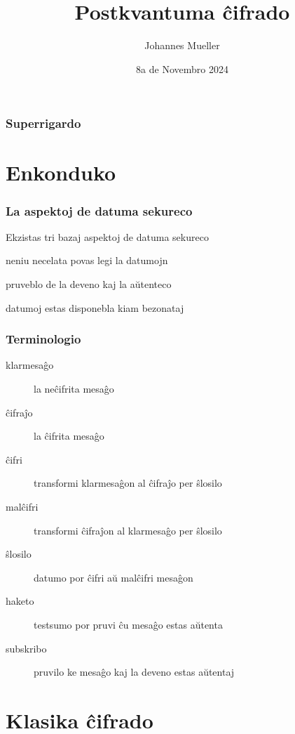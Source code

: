 \documentclass[utf8, aspectratio=169]{beamer}
\title{Postkvantuma ĉifrado}
\author{Johannes Mueller}
\institute{KAEST 2024 – Žilina}
\date{8a de Novembro 2024}
\begin{document}
\begin{frame}
  \titlepage
\end{frame}

\begin{frame}
  \frametitle{Superrigardo}
  \tableofcontents
\end{frame}

\section{Enkonduko}

\begin{frame}
  \frametitle{La aspektoj de datuma sekureco}

  Ekzistas tri bazaj aspektoj de datuma sekureco

  \begin{description}
  \item<2->[konfidenteco] { neniu necelata povas legi la datumojn}
  \item<3->[fidindeco] { pruveblo de la deveno kaj la aŭtenteco}
  \item<4->[disponeblo] { datumoj estas disponebla kiam bezonataj}
  \end{description}

  \vspace{1em}
\end{frame}

\begin{frame}
  \frametitle{Terminologio}
  \begin{description}
  \item[klarmesaĝo] la neĉifrita mesaĝo
  \item[ĉifraĵo] la ĉifrita mesaĝo
  \item[ĉifri] transformi klarmesaĝon al ĉifraĵo per ŝlosilo
  \item[malĉifri] transformi ĉifraĵon al klarmesaĝo per ŝlosilo
  \item[ŝlosilo] datumo por ĉifri aŭ malĉifri mesaĝon
  \item[haketo] testsumo por pruvi ĉu mesaĝo estas aŭtenta
  \item[subskribo] pruvilo ke mesaĝo kaj la deveno estas aŭtentaj
  \end{description}
\end{frame}


\section{Klasika ĉifrado}
\end{document}
